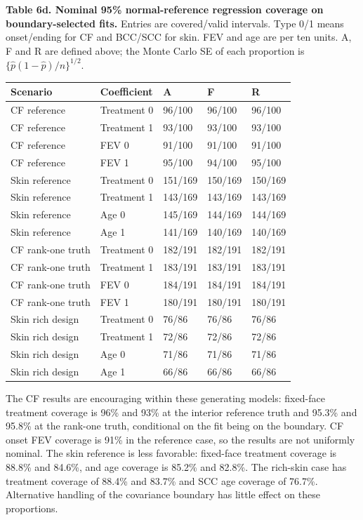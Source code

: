 \documentclass[11pt]{article}
\begin{document}
\label{tab:6d}
\textbf{Table 6d. Nominal 95\% normal-reference regression coverage on boundary-selected fits.} Entries are covered/valid intervals. Type 0/1 means onset/ending for CF and BCC/SCC for skin. FEV and age are per ten units. A, F and R are defined above; the Monte Carlo SE of each proportion is \(\{\widehat p(1-\widehat p)/n\}^{1/2}\).

{
\begin{longtable}{lllll}
\toprule
\textbf{Scenario} & \textbf{Coefficient} & \textbf{A} & \textbf{F} & \textbf{R} \\
\midrule
\endhead
\bottomrule
\endlastfoot
CF reference & Treatment 0 & 96/100 & 96/100 & 96/100 \\
CF reference & Treatment 1 & 93/100 & 93/100 & 93/100 \\
CF reference & FEV 0 & 91/100 & 91/100 & 91/100 \\
CF reference & FEV 1 & 95/100 & 94/100 & 95/100 \\
Skin reference & Treatment 0 & 151/169 & 150/169 & 150/169 \\
Skin reference & Treatment 1 & 143/169 & 143/169 & 143/169 \\
Skin reference & Age 0 & 145/169 & 144/169 & 144/169 \\
Skin reference & Age 1 & 141/169 & 140/169 & 140/169 \\
CF rank-one truth & Treatment 0 & 182/191 & 182/191 & 182/191 \\
CF rank-one truth & Treatment 1 & 183/191 & 183/191 & 183/191 \\
CF rank-one truth & FEV 0 & 184/191 & 184/191 & 184/191 \\
CF rank-one truth & FEV 1 & 180/191 & 180/191 & 180/191 \\
Skin rich design & Treatment 0 & 76/86 & 76/86 & 76/86 \\
Skin rich design & Treatment 1 & 72/86 & 72/86 & 72/86 \\
Skin rich design & Age 0 & 71/86 & 71/86 & 71/86 \\
Skin rich design & Age 1 & 66/86 & 66/86 & 66/86 \\
\end{longtable}}

The CF results are encouraging within these generating models: fixed-face treatment coverage is 96\% and 93\% at the interior reference truth and 95.3\% and 95.8\% at the rank-one truth, conditional on the fit being on the boundary. CF onset FEV coverage is 91\% in the reference case, so the results are not uniformly nominal. The skin reference is less favorable: fixed-face treatment coverage is 88.8\% and 84.6\%, and age coverage is 85.2\% and 82.8\%. The rich-skin case has treatment coverage of 88.4\% and 83.7\% and SCC age coverage of 76.7\%. Alternative handling of the covariance boundary has little effect on these proportions.
\end{document}
